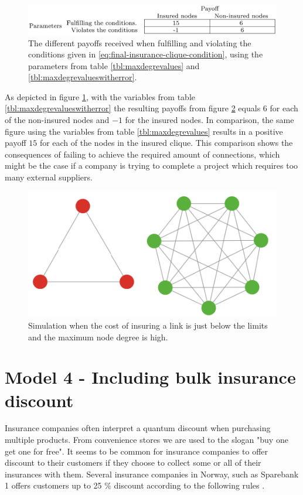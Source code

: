 \begin{figure}[h]
\centering
  \includegraphics[width=1.0\linewidth]{../Figures/payoffWhenFulfillingAndViolatingConditionsInMaxDegreeSimulation.png}
  \caption{\label{fig:payoffMaxDegreeSimulation} The different payoffs received when fulfilling and violating the conditions given in \ref{eq:final-insurance-clique-condition}, using the parameters from table \ref{tbl:maxdegrevalues} and \ref{tbl:maxdegrevalueswitherror}. }
\end{figure}

As depicted in figure \ref{fig:payoffMaxDegreeSimulation}, with the variables from table \ref{tbl:maxdegrevalueswitherror} the resulting payoffs from figure \ref{fig:bonusviolatingWithErrors} equals $6$ for each of the non-insured nodes and $-1$ for the insured nodes. In comparison, the same figure using the variables from table \ref{tbl:maxdegrevalues} results in a positive payoff $15$ for each of the nodes in the insured clique. This comparison shows the consequences of failing to achieve the required amount of connections, which might be the case if a company is trying to complete a project which requires too many external suppliers. 

\begin{figure}[h]
\centering
  \includegraphics[width=0.6\linewidth]{../Figures/BonusGameInsuredCliqueWithErrors.png}
  \caption{\label{fig:bonusviolatingWithErrors} Simulation when the cost of insuring a link is just below the limits and the maximum node degree is high. }
\end{figure}

\section{Model 4 - Including bulk insurance discount}

Insurance companies often interpret a quantum discount when purchasing multiple products. From convenience stores we are used to the slogan "buy one get one for free". It seems to be common for insurance companies to offer discount to their customers if they choose to collect some or all of their insurances with them. Several insurance companies in Norway, such as Sparebank 1 offers customers up to 25 $\%$ discount according to the following rules \cite{sparebank1}. 

